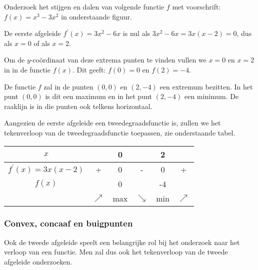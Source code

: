 \begin{voorbeeld}
	Onderzoek het stijgen en dalen van volgende functie $f$ met voorschrift: $f(x)=x^{3}-3x^{2}$ in onderstaande figuur.
	

De eerste afgeleide $f^{'}(x)=3x^{2}-6x$ is nul als $3x^{2}-6x=3x(x-2)=0$, dus als $x=0$ of als $x=2$.

Om de $y$-co\"ordinaat van deze extrema punten te vinden
vullen we $x=0$ en $x=2$ in in de functie $f(x)$. Dit geeft: $f(0)=0$
en $f(2)=-4$.

De functie $f$ zal in de punten $(0,0)$ en $(2,-4)$ een
extremum bezitten. In het punt $(0,0)$ is dit een maximum en in het
punt $(2,-4)$ een minimum. De raaklijn is in die punten ook telkens
horizontaal.

Aangezien de eerste afgeleide een tweedegraadsfunctie is,
zullen we het tekenverloop van de tweedegraadsfunctie toepassen, zie onderstaande tabel.

\begin{center}
	\begin{tabular}{c||c|c|c|c|c}
	$x$ &  & 0 &  & 2 & \tabularnewline
	\hline 
	$f^{'}(x)=3x(x-2)$ & + & 0 & - & 0 & + \\
	\hline 
	$f(x)$ &  & 0 &  & -4 & \\
	& $\nearrow$ & max & $\searrow$ & min & $\nearrow$ \\
\end{tabular}
\end{center}



\end{voorbeeld}

\subsubsection{Convex, concaaf en buigpunten}

Ook de tweede afgeleide speelt een belangrijke rol bij het
onderzoek naar het verloop van een functie. Men zal dus ook het tekenverloop
van de tweede afgeleide onderzoeken.


